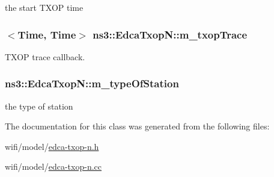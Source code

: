 the start T\+X\+OP time 

\subsubsection[{\texorpdfstring{m\+\_\+txop\+Trace}{m_txopTrace}}]{$<${\bf Time}, {\bf Time}$>$ ns3\+::\+Edca\+Txop\+N\+::m\+\_\+txop\+Trace\hspace{0.3cm}{\ttfamily [private]}}\hypertarget{classns3_1_1EdcaTxopN_a451e4a459e0cf4946cc57cc4fe4e64cc}{}\label{classns3_1_1EdcaTxopN_a451e4a459e0cf4946cc57cc4fe4e64cc}


T\+X\+OP trace callback. 

\subsubsection[{\texorpdfstring{m\+\_\+type\+Of\+Station}{m_typeOfStation}}]{ ns3\+::\+Edca\+Txop\+N\+::m\+\_\+type\+Of\+Station\hspace{0.3cm}{\ttfamily [private]}}\hypertarget{classns3_1_1EdcaTxopN_a2c8e52226f121e25a17e176a3a1594bb}{}\label{classns3_1_1EdcaTxopN_a2c8e52226f121e25a17e176a3a1594bb}


the type of station 



The documentation for this class was generated from the following files\+:\begin{DoxyCompactItemize}
\item 
wifi/model/\hyperlink{edca-txop-n_8h}{edca-\/txop-\/n.\+h}\item 
wifi/model/\hyperlink{edca-txop-n_8cc}{edca-\/txop-\/n.\+cc}\end{DoxyCompactItemize}
